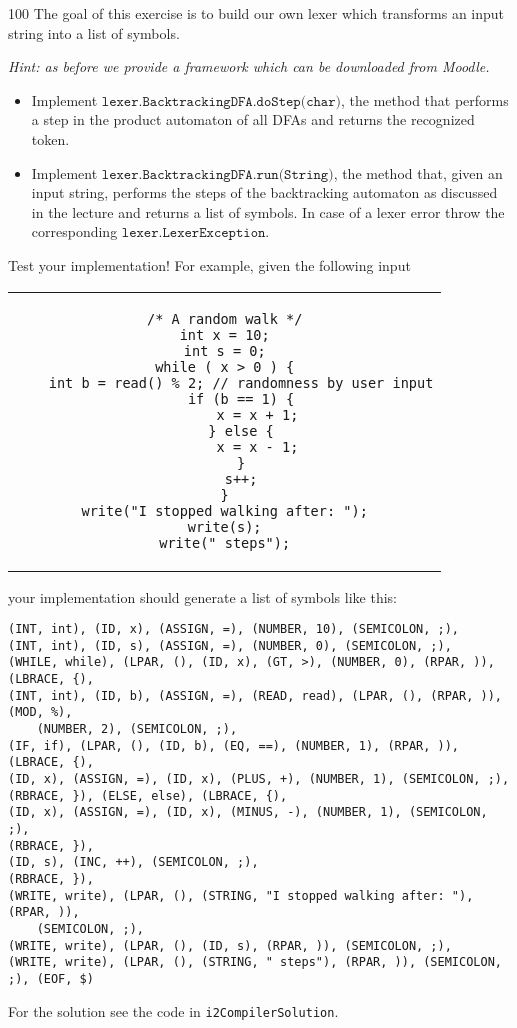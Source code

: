\documentclass[a4paper]{article}
\begin{document}
\begin{exercise}{100}
The goal of this exercise is to build our own lexer which transforms an input string into a list of symbols.

\emph{Hint: as before we provide a framework which can be downloaded from Moodle.}

\begin{itemize}
  \item Implement $\texttt{lexer.BacktrackingDFA.doStep(char)}$, the method that performs a step in the product automaton of all DFAs and returns the recognized token.
  \item Implement $\texttt{lexer.BacktrackingDFA.run(String)}$, the method that, given an input string, performs the steps of the backtracking automaton as discussed in the lecture and returns a list of symbols.
    In case of a lexer error throw the corresponding $\texttt{lexer.LexerException}$.
\end{itemize}

Test your implementation! For example, given the following input

\begin{center}
  \begin{tabular}{c}
    \begin{lstlisting}
/* A random walk */
int x = 10;
int s = 0;
while ( x > 0 ) {
	int b = read() % 2; // randomness by user input
	if (b == 1) {
		x = x + 1;
	} else {
		x = x - 1;
	}
	s++;
}
write("I stopped walking after: ");
write(s);
write(" steps");
    \end{lstlisting}
  \end{tabular}
\end{center}

your implementation should generate a list of symbols like this:

\begin{verbatim}
(INT, int), (ID, x), (ASSIGN, =), (NUMBER, 10), (SEMICOLON, ;),
(INT, int), (ID, s), (ASSIGN, =), (NUMBER, 0), (SEMICOLON, ;),
(WHILE, while), (LPAR, (), (ID, x), (GT, >), (NUMBER, 0), (RPAR, )), (LBRACE, {),
(INT, int), (ID, b), (ASSIGN, =), (READ, read), (LPAR, (), (RPAR, )), (MOD, %),
    (NUMBER, 2), (SEMICOLON, ;),
(IF, if), (LPAR, (), (ID, b), (EQ, ==), (NUMBER, 1), (RPAR, )), (LBRACE, {),
(ID, x), (ASSIGN, =), (ID, x), (PLUS, +), (NUMBER, 1), (SEMICOLON, ;),
(RBRACE, }), (ELSE, else), (LBRACE, {),
(ID, x), (ASSIGN, =), (ID, x), (MINUS, -), (NUMBER, 1), (SEMICOLON, ;),
(RBRACE, }),
(ID, s), (INC, ++), (SEMICOLON, ;),
(RBRACE, }),
(WRITE, write), (LPAR, (), (STRING, "I stopped walking after: "), (RPAR, )),
    (SEMICOLON, ;),
(WRITE, write), (LPAR, (), (ID, s), (RPAR, )), (SEMICOLON, ;),
(WRITE, write), (LPAR, (), (STRING, " steps"), (RPAR, )), (SEMICOLON, ;), (EOF, $)
\end{verbatim}
\end{exercise}

\begin{solution}
For the solution see the code in \texttt{i2CompilerSolution}.
\end{solution}
\end{document}
